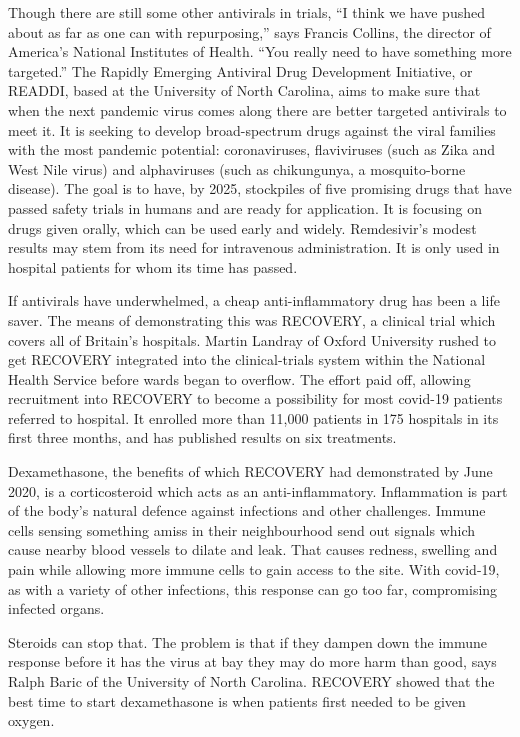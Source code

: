 \documentclass{article}
\begin{document}
Though there are still some other antivirals in trials, ``I think we have pushed about as far as one can with repurposing,'' says Francis Collins, the director of America's National Institutes of Health. ``You really need to have something more targeted.'' The Rapidly Emerging Antiviral Drug Development Initiative, or READDI, based at the University of North Carolina, aims to make sure that when the next pandemic virus comes along there are better targeted antivirals to meet it. It is seeking to develop broad-spectrum drugs against the viral families with the most pandemic potential: coronaviruses, flaviviruses (such as Zika and West Nile virus) and alphaviruses (such as chikungunya, a mosquito-borne disease). The goal is to have, by 2025, stockpiles of five promising drugs that have passed safety trials in humans and are ready for application. It is focusing on drugs given orally, which can be used early and widely. Remdesivir's modest results may stem from its need for intravenous administration. It is only used in hospital patients for whom its time has passed. 

If antivirals have underwhelmed, a cheap anti-inflammatory drug has been a life saver. The means of demonstrating this was RECOVERY, a clinical trial which covers all of Britain's hospitals. Martin Landray of Oxford University rushed to get RECOVERY integrated into the clinical-trials system within the National Health Service before wards began to overflow. The effort paid off, allowing recruitment into RECOVERY to become a possibility for most covid-19 patients referred to hospital. It enrolled more than 11,000 patients in 175 hospitals in its first three months, and has published results on six treatments. 

Dexamethasone, the benefits of which RECOVERY had demonstrated by June 2020, is a corticosteroid which acts as an anti-inflammatory. Inflammation is part of the body's natural defence against infections and other challenges. Immune cells sensing something amiss in their neighbourhood send out signals which cause nearby blood vessels to dilate and leak. That causes redness, swelling and pain while allowing more immune cells to gain access to the site. With covid-19, as with a variety of other infections, this response can go too far, compromising infected organs. 

Steroids can stop that. The problem is that if they dampen down the immune response before it has the virus at bay they may do more harm than good, says Ralph Baric of the University of North Carolina. RECOVERY showed that the best time to start dexamethasone is when patients first needed to be given oxygen. 
\end{document}
